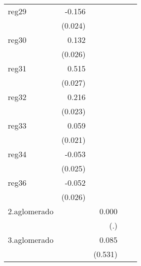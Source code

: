 {\begin{longtable}{l*{4}{D{.}{.}{-1}}}
\addlinespace
reg29       &      -0.156\sym{***}&                     &                     &                     \\
            &     (0.024)         &                     &                     &                     \\
\addlinespace
reg30       &       0.132\sym{***}&                     &                     &                     \\
            &     (0.026)         &                     &                     &                     \\
\addlinespace
reg31       &       0.515\sym{***}&                     &                     &                     \\
            &     (0.027)         &                     &                     &                     \\
\addlinespace
reg32       &       0.216\sym{***}&                     &                     &                     \\
            &     (0.023)         &                     &                     &                     \\
\addlinespace
reg33       &       0.059\sym{**} &                     &                     &                     \\
            &     (0.021)         &                     &                     &                     \\
\addlinespace
reg34       &      -0.053\sym{*}  &                     &                     &                     \\
            &     (0.025)         &                     &                     &                     \\
\addlinespace
reg36       &      -0.052\sym{*}  &                     &                     &                     \\
            &     (0.026)         &                     &                     &                     \\
\addlinespace
2.aglomerado&                     &       0.000         &                     &                     \\
            &                     &         (.)         &                     &                     \\
\addlinespace
3.aglomerado&                     &       0.085         &                     &                     \\
            &                     &     (0.531)         &                     &                     \\

\end{longtable}}
